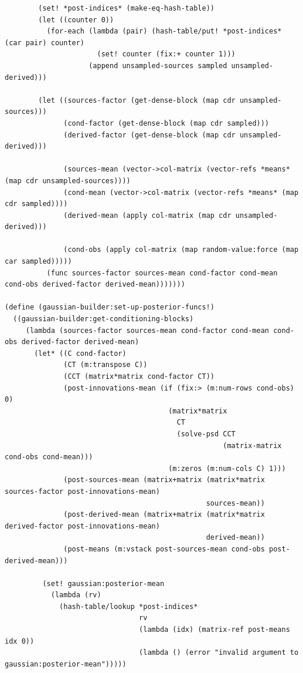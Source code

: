 \documentclass{article}
\begin{document}
\begin{verbatim}
        (set! *post-indices* (make-eq-hash-table))
        (let ((counter 0))
          (for-each (lambda (pair) (hash-table/put! *post-indices* (car pair) counter)
                      (set! counter (fix:+ counter 1)))
                    (append unsampled-sources sampled unsampled-derived)))

        (let ((sources-factor (get-dense-block (map cdr unsampled-sources)))
              (cond-factor (get-dense-block (map cdr sampled)))
              (derived-factor (get-dense-block (map cdr unsampled-derived)))

              (sources-mean (vector->col-matrix (vector-refs *means* (map cdr unsampled-sources))))
              (cond-mean (vector->col-matrix (vector-refs *means* (map cdr sampled))))
              (derived-mean (apply col-matrix (map cdr unsampled-derived)))

              (cond-obs (apply col-matrix (map random-value:force (map car sampled)))))
          (func sources-factor sources-mean cond-factor cond-mean cond-obs derived-factor derived-mean)))))))

(define (gaussian-builder:set-up-posterior-funcs!)
  ((gaussian-builder:get-conditioning-blocks)
     (lambda (sources-factor sources-mean cond-factor cond-mean cond-obs derived-factor derived-mean)
       (let* ((C cond-factor)
              (CT (m:transpose C))
              (CCT (matrix*matrix cond-factor CT))
              (post-innovations-mean (if (fix:> (m:num-rows cond-obs) 0)
                                       (matrix*matrix
                                         CT
                                         (solve-psd CCT
                                                    (matrix-matrix cond-obs cond-mean)))
                                       (m:zeros (m:num-cols C) 1)))
              (post-sources-mean (matrix+matrix (matrix*matrix sources-factor post-innovations-mean)
                                                sources-mean))
              (post-derived-mean (matrix+matrix (matrix*matrix derived-factor post-innovations-mean)
                                                derived-mean))
              (post-means (m:vstack post-sources-mean cond-obs post-derived-mean)))

         (set! gaussian:posterior-mean
           (lambda (rv)
             (hash-table/lookup *post-indices*
                                rv
                                (lambda (idx) (matrix-ref post-means idx 0))
                                (lambda () (error "invalid argument to gaussian:posterior-mean")))))



\end{verbatim}
\end{document}
